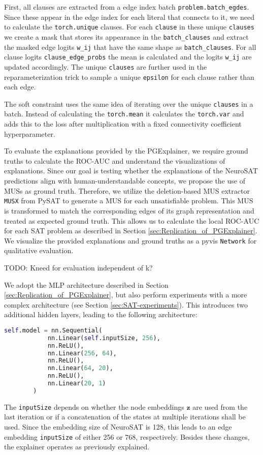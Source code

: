 First, all clauses are extracted from a edge index batch \lstinline|problem.batch_egdes|. Since these appear in the edge index for each literal that connects to it, we need to calculate the \lstinline|torch.unique| clauses. For each \lstinline|clause| in these unique \lstinline|clauses| we create a mask that stores its appearance in the \lstinline|batch_clauses| and extract the masked edge logits \lstinline|w_ij| that have the same shape as \lstinline|batch_clauses|. For all clause logits \lstinline|clause_edge_probs| the mean is calculated and the logits \lstinline|w_ij| are updated accordingly.
The unique \lstinline|clauses| are further used in the reparameterization trick to sample a unique \lstinline|epsilon| for each clause rather than each edge.

The soft constraint uses the same idea of iterating over the unique \lstinline|clauses| in a batch. Instead of calculating the \lstinline|torch.mean| it calculates the \lstinline|torch.var| and adds this to the loss after multiplication with a fixed connectivity coefficient hyperparameter. \bigskip

To evaluate the explanations provided by the PGExplainer, we require ground truths to calculate the ROC-AUC and understand the visualizations of explanations. Since our goal is testing whether the explanations of the NeuroSAT predictions align with human-understandable concepts, we propose the use of MUSs as ground truth. Therefore, we utilize the deletion-based MUS extractor \lstinline|MUSX| from PySAT \cite{imms-sat18} to generate a MUS for each unsatisfiable problem. This MUS is transformed to match the corresponding edges of its graph representation and treated as expected ground truth. This allows us to calculate the local ROC-AUC for each SAT problem as described in Section \ref{sec:Replication_of_PGExplainer}. We visualize the provided explanations and ground truths as a pyvis \cite{perrone2020network} \lstinline|Network| for qualitative evaluation. \bigskip

TODO: Kneed for evaluation independent of k?

We adopt the MLP architecture described in Section \ref{sec:Replication_of_PGExplainer}, but also perform experiments with a more complex architecture (see Section \ref{sec:SAT-experiments}). This introduces two additional hidden layers, leading to the following architecture:
\begin{lstlisting}[language=Python, caption=Implementation of extended MLP architecture, label=lst:ext_mlp_arch]
    self.model = nn.Sequential(
            nn.Linear(self.inputSize, 256),
            nn.ReLU(),
            nn.Linear(256, 64),
            nn.ReLU(),
            nn.Linear(64, 20),
            nn.ReLU(),
            nn.Linear(20, 1)
        )
\end{lstlisting}
The \lstinline|inputSize| depends on whether the node embeddings $\mathbf{z}$ are used from the last iteration or if a concatenation of the states at multiple iterations shall be used. Since the embedding size of NeuroSAT is 128, this leads to an edge embedding \lstinline|inputSize| of either 256 or 768, respectively. Besides these changes, the explainer operates as previously explained.